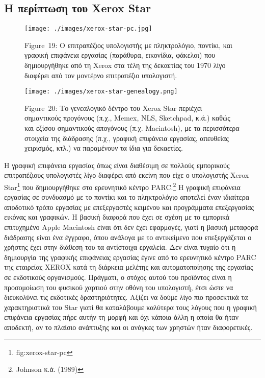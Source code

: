 \documentclass[
]{article}
\begin{document}
\hypertarget{ux3b7-ux3c0ux3b5ux3c1ux3afux3c0ux3c4ux3c9ux3c3ux3b7-ux3c4ux3bfux3c5-xerox-star}{%
\subsection{Η περίπτωση του Xerox
Star}\label{ux3b7-ux3c0ux3b5ux3c1ux3afux3c0ux3c4ux3c9ux3c3ux3b7-ux3c4ux3bfux3c5-xerox-star}}

\leavevmode{}%
\begin{figure}
\hypertarget{fig:xerox-star-pc}{%
\centering
\texttt{[image: ./images/xerox-star-pc.jpg]}
\caption{Figure~19: Ο επιτραπέζιος υπολογιστής με πληκτρολόγιο, ποντίκι,
και γραφική επιφάνεια εργασίας (παράθυρα, εικονίδια, φάκελοι) που
δημιουργήθηκε από τη Xerox στα τέλη της δεκαετίας του 1970 λίγο διαφέρει
από τον μοντέρνο επιτραπέζιο υπολογιστή.}\label{fig:xerox-star-pc}
}
\end{figure}

\leavevmode{}%
\begin{figure}
\hypertarget{fig:xerox-star-genealogy}{%
\centering
\texttt{[image: ./images/xerox-star-genealogy.png]}
\caption{Figure~20: Το γενεαλογικό δέντρο του Xerox Star περιέχει
σημαντικούς προγόνους (π.χ., Memex, NLS, Sketchpad, κ.ά.) καθώς και
εξίσου σημαντικούς απογόνους (π.χ. Macintosh), με τα περισσότερα
στοιχεία της διάδρασης (π.χ., γραφική επιφάνεια εργασίας, απευθείας
χειρισμός, κτλ.) να παραμένουν τα ίδια για
δεκαετίες.}\label{fig:xerox-star-genealogy}
}
\end{figure}

Η γραφική επιφάνεια εργασίας όπως είναι διαθέσιμη σε πολλούς εμπορικούς
επιτραπέζιους υπολογιστές λίγο διαφέρει από εκείνη που είχε ο
υπολογιστής Xerox Star\footnote{fig:xerox-star-pc} που δημιουργήθηκε στο
ερευνητικό κέντρο PARC.\footnote{Johnson κ.ά. (1989)} Η γραφική
επιφάνεια εργασίας σε συνδυασμό με το ποντίκι και το πληκτρολόγιο
αποτελεί έναν ιδιαίτερα αποδοτικό τρόπο εργασίας με επεξεργαστές
κειμένου και προγράμματα επεξεργασίας εικόνας και γραφικών. Η βασική
διαφορά που έχει σε σχέση με το εμπορικά επιτυχημένο Apple Macintosh
είναι ότι δεν έχει εφαρμογές, γιατί η βασική μεταφορά διάδρασης είναι
ένα έγγραφο, όπου ανάλογα με το αντικείμενο που επεξεργάζεται ο χρήστης
έχει στην διάθεση του τα αντίστοιχα εργαλεία. Δεν είναι τυχαίο ότι η
δημιουργία της γραφικής επιφάνειας εργασίας έγινε από το ερευνητικό
κέντρο PARC της εταιρείας XEROX κατά τη διάρκεια μελέτης και
αυτοματοποίησης της εργασίας σε εκδοτικούς οργανισμούς. Πράγματι, ο
στόχος αυτού του προϊόντος είναι η προσομοίωση του φυσικού χαρτιού στην
οθόνη του υπολογιστή, έτσι ώστε να διευκολύνει τις εκδοτικές
δραστηριότητες. Αξίζει να δούμε λίγο πιο προσεκτικά τα χαρακτηριστικά
του Star γιατί θα καταλάβουμε καλύτερα τους λόγους που η γραφική
επιφάνεια εργασίας πήρε αυτήν τη μορφή και όχι κάποια άλλη η οποία θα
ήταν αποδεκτή, αν το πλαίσιο ανάπτυξης και οι ανάγκες των χρηστών ήταν
διαφορετικές.
\end{document}
